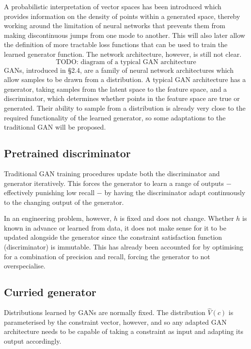 \documentclass[../../main.tex]{subfiles}
\begin{document}
A probabilistic interpretation of vector spaces has been introduced which provides information on the density of points within a generated space, thereby working around the limitation of neural networks that prevents them from making discontinuous jumps from one mode to another.
This will also later allow the definition of more tractable loss functions that can be used to train the learned generator function.
The network architecture, however, is still not clear.
$$\text{TODO: diagram of a typical GAN architecture}$$
GANs, introduced in \S 2.4, are a family of neural network architectures which allow samples to be drawn from a distribution.
A typical GAN architecture has a generator, taking samples from the latent space to the feature space, and a discriminator, which determines whether points in the feature space are true or generated.
Their ability to sample from a distribution is already very close to the required functionality of the learned generator, so some adaptations to the traditional GAN will be proposed.

\subsection{Pretrained discriminator}

Traditional GAN training procedures update both the discriminator and generator iteratively.
This forces the generator to learn a range of outputs $-$ effectively punishing low recall $-$ by having the discriminator adapt continuously to the changing output of the generator.

In an engineering problem, however, $h$ is fixed and does not change.
Whether $h$ is known in advance or learned from data, it does not make sense for it to be updated alongside the generator since the constraint satisfaction function (discriminator) is immutable.
This has already been accounted for by optimising for a combination of precision and recall, forcing the generator to not overspecialise.

\subsection{Curried generator}

Distributions learned by GANs are normally fixed.
The distribution $\hat{V}(c)$ is parameterised by the constraint vector, however, and so any adapted GAN architecture needs to be capable of taking a constraint as input and adapting its output accordingly.
\end{document}
